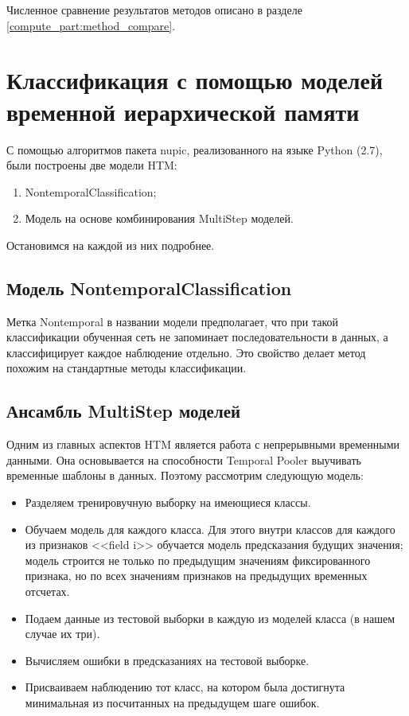 Численное сравнение результатов методов описано в разделе \ref{compute_part:method_compare}.

\section{Классификация с помощью моделей временной иерархической памяти}
С помощью алгоритмов пакета nupic, реализованного на языке Python (2.7), были построены две модели HTM: 
\begin{enumerate}
\item NontemporalClassification;
\item Модель на основе комбинирования MultiStep моделей.
\end{enumerate}
Остановимся на каждой из них подробнее.

\subsection{Модель NontemporalClassification}
Метка Nontemporal в названии модели предполагает, что при такой классификации обученная сеть не запоминает последовательности в данных, а классифицирует каждое наблюдение отдельно. Это свойство делает метод похожим на стандартные методы классификации.

\subsection{Ансамбль MultiStep моделей}
Одним из главных аспектов HTM является работа с непрерывными временными данными. Она основывается на способности Temporal Pooler выучивать временные шаблоны в данных. Поэтому рассмотрим следующую модель:
\begin{itemize}
\item Разделяем тренировучную выборку на имеющиеся классы.
\item Обучаем модель для каждого класса. Для этого внутри классов для каждого из признаков <<field i>> обучается модель предсказания будущих значения; модель строится не только по предыдущим значениям фиксированного признака, но по всех значениям признаков на предыдущих временных отсчетах.
\item Подаем данные из тестовой выборки в каждую из моделей класса (в нашем случае их три).
\item Вычисляем ошибки в предсказаниях на тестовой выборке. 
\item Присваиваем наблюдению тот класс, на котором была достигнута минимальная из посчитанных на предыдущем шаге ошибок.
\end{itemize} 

